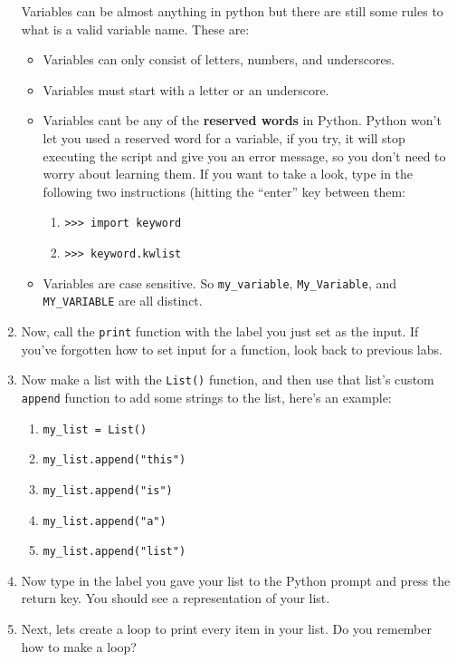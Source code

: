 \documentclass{article}
\begin{document}
\begin{enumerate}
    Variables can be almost anything in python but there are still some rules to what is a valid variable name.  These are:
    \begin{itemize}
        \item Variables can only consist of letters, numbers, and underscores.
        \item Variables must start with a letter or an underscore.
        \item Variables cant be any of the \textbf{reserved words} in Python.  
              Python won't let you used a reserved word for a variable, if you try, it will stop executing the script and give you an error message, so you don't need to worry about learning them.  If you want to take a look, type in the following two instructions (hitting the ``enter'' key between them: 
              \begin{enumerate}
                  \item \texttt{>>> import keyword}
                  \item \texttt{>>> keyword.kwlist}
              \end{enumerate}
        \item Variables are case sensitive.  So \texttt{my\_variable}, \texttt{My\_Variable}, and \texttt{MY\_VARIABLE} are all distinct.
    \end{itemize}
    \item Now, call the \texttt{print} function with the label you just set as the input.  If you've forgotten how to set input for a function, look back to previous labs.
    \item Now make a list with the \texttt{List()} function, and then use that list's custom \texttt{append} function to add some strings to the list, here's an example:
    \begin{enumerate}
        \item \texttt{my\_list = List()} 
        \item \texttt{my\_list.append("this")}
        \item \texttt{my\_list.append("is")}
        \item \texttt{my\_list.append("a")} 
        \item \texttt{my\_list.append("list")}
    \end{enumerate}

    \item Now type in the label you gave your list to the Python prompt and press the return key.  You should see a representation of your list.
    \item Next, lets create a loop to print every item in your list.  Do you remember how to make a loop?


\end{enumerate}
\end{document}
